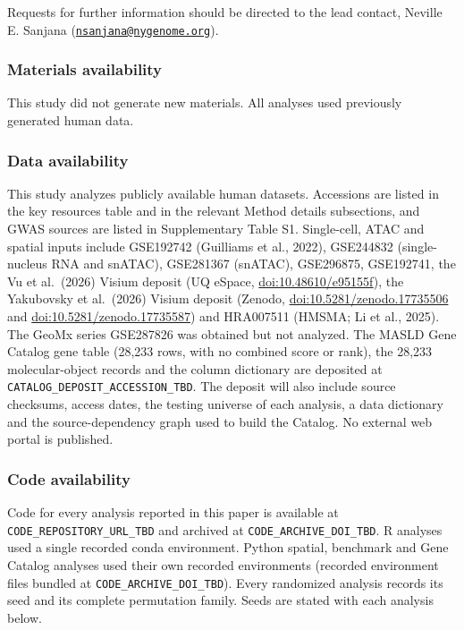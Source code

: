 Requests for further information should be directed to the lead contact, Neville E. Sanjana (\href{mailto:nsanjana@nygenome.org}{\nolinkurl{nsanjana@nygenome.org}}).

\subsubsection{Materials availability}\label{materials-availability}

This study did not generate new materials. All analyses used previously generated human data.

\subsubsection{Data availability}\label{data-availability}

This study analyzes publicly available human datasets. Accessions are listed in the key resources table and in the relevant Method details subsections, and GWAS sources are listed in Supplementary Table S1. Single-cell, ATAC and spatial inputs include GSE192742 (Guilliams et al., 2022), GSE244832 (single-nucleus RNA and snATAC), GSE281367 (snATAC), GSE296875, GSE192741, the Vu et al.~(2026) Visium deposit (UQ eSpace, \url{doi:10.48610/e95155f}), the Yakubovsky et al.~(2026) Visium deposit (Zenodo, \url{doi:10.5281/zenodo.17735506} and \url{doi:10.5281/zenodo.17735587}) and HRA007511 (HMSMA; Li et al., 2025). The GeoMx series GSE287826 was obtained but not analyzed. The MASLD Gene Catalog gene table (28,233 rows, with no combined score or rank), the 28,233 molecular-object records and the column dictionary are deposited at \texttt{CATALOG\_DEPOSIT\_ACCESSION\_TBD}. The deposit will also include source checksums, access dates, the testing universe of each analysis, a data dictionary and the source-dependency graph used to build the Catalog. No external web portal is published.

\subsubsection{Code availability}\label{code-availability}

Code for every analysis reported in this paper is available at \texttt{CODE\_REPOSITORY\_URL\_TBD} and archived at \texttt{CODE\_ARCHIVE\_DOI\_TBD}. R analyses used a single recorded conda environment. Python spatial, benchmark and Gene Catalog analyses used their own recorded environments (recorded environment files bundled at \texttt{CODE\_ARCHIVE\_DOI\_TBD}). Every randomized analysis records its seed and its complete permutation family. Seeds are stated with each analysis below.

